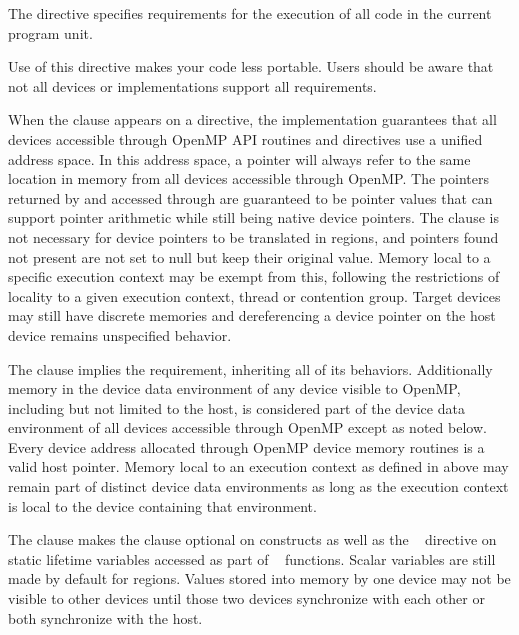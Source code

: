 \begin{fortranspecific}
The  directive specifies requirements for the execution of all
code in the current program unit.
\end{fortranspecific}

\begin{note}
Use of this directive makes your code less portable. Users should be aware that not all
devices or implementations support all requirements.
\end{note}

When the  clause appears on a 
directive, the implementation guarantees that all devices accessible through
OpenMP API routines and directives use a unified address space. In this
address space, a pointer will always refer to the same location in memory
from all devices accessible through OpenMP.  The pointers returned by
 and accessed through  are
guaranteed to be pointer values that can support pointer arithmetic while
still being native device pointers. The  clause is not
necessary for device pointers to be translated in  regions, and
pointers found not present are not set to null but keep their original value.
Memory local to a specific execution context may be exempt from this,
following the restrictions of locality to a given execution context, thread or
contention group.  Target devices may still have discrete memories and
dereferencing a device pointer on the host device remains unspecified
behavior.

The  clause implies the 
requirement, inheriting all of its behaviors.  Additionally memory in the
device data environment of any device visible to OpenMP, including but not
limited to the host, is considered part of the device data environment of all
devices accessible through OpenMP except as noted below.  Every device address
allocated through OpenMP device memory routines is a valid host pointer. Memory
local to an execution context as defined in  above may remain
part of distinct device data environments as long as the execution context is
local to the device containing that environment.

The  clause makes the  clause optional
on  constructs as well as the ~
directive on static lifetime variables accessed as part of
~ functions.  Scalar variables are still made
 by default for  regions.  Values stored into
memory by one device may not be visible to other devices until those two
devices synchronize with each other or both synchronize with the host.

